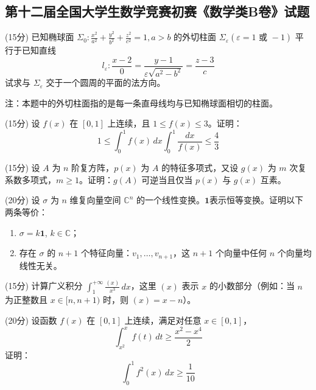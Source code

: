 \documentclass[loose]{ExBook}
\begin{document}
\subsection{第十二届全国大学生数学竞赛初赛《数学类B卷》试题}
\begin{qitems}
    \begin{bbox}
        \qitem (15分) 已知椭球面 \(\Sigma_0 : \frac{x^2}{a^2} + \frac{y^2}{b^2} + \frac{z^2}{c^2} = 1, a > b\) 的外切柱面 \(\Sigma_\varepsilon (\varepsilon = 1 \text{ 或 } -1)\) 平行于已知直线
        \[l_\varepsilon : \frac{x - 2}{0} = \frac{y - 1}{\varepsilon \sqrt{a^2 - b^2}} = \frac{z - 3}{c}\]
        试求与 \(\Sigma_\varepsilon\) 交于一个圆周的平面的法方向。

        注：本题中的外切柱面指的是每一条直母线均与已知椭球面相切的柱面。
    \end{bbox}

    \begin{bbox}
        \qitem (15分) 设 \(f(x)\) 在 \([0,1]\) 上连续，且 \(1 \leq f(x) \leq 3\)。证明：
        \[1 \leq \int_{0}^{1} f(x) \, dx \int_{0}^{1} \frac{dx}{f(x)} \leq \frac{4}{3}\]
    \end{bbox}

    \begin{bbox}
        \qitem (15分) 设 \(A\) 为 \(n\) 阶复方阵，\(p(x)\) 为 \(A\) 的特征多项式，又设 \(g(x)\) 为 \(m\) 次复系数多项式，\(m \geq 1\)。证明：\(g(A)\) 可逆当且仅当 \(p(x)\) 与 \(g(x)\) 互素。
    \end{bbox}

    \begin{bbox}
        \qitem (20分) 设 \(\sigma\) 为 \(n\) 维复向量空间 \(\mathbb{C}^n\) 的一个线性变换。$\bm{1}$表示恒等变换。证明以下两条等价：

        \begin{enumerate}[label=(\arabic*)]
            \item \(\sigma = k\bm{1}\), \(k \in \mathbb{C}\)；
            \item 存在 \(\sigma\) 的 \(n + 1\) 个特征向量：\(v_1, \ldots, v_{n+1}\)，这 \(n + 1\) 个向量中任何 \(n\) 个向量均线性无关。
        \end{enumerate}
    \end{bbox}

    \begin{bbox}
        \qitem (15分) 计算广义积分 \(\int_{1}^{+\infty} \frac{(x)}{x^3} \, dx\)，这里 \((x)\) 表示 \(x\) 的小数部分（例如：当 \(n\) 为正整数且 \(x \in [n, n + 1)\) 时，则 \((x) = x - n\)）。
    \end{bbox}

    \begin{bbox}
        \qitem (20分) 设函数 \(f(x)\) 在 \([0,1]\) 上连续，满足对任意 \(x \in [0,1]\)，
        \[
        \int_{x^2}^{x} f(t) \, dt \geq \frac{x^2 - x^4}{2}
        \]
        证明：
        \[
        \int_{0}^{1} f^2(x) \, dx \geq \frac{1}{10}
        \]
    \end{bbox}
\end{qitems}
\end{document}

